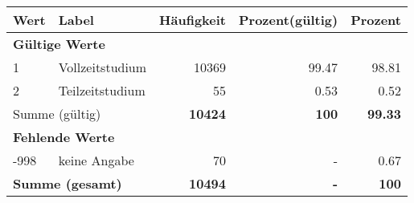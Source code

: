      \begin{longtable}{lXrrr}
     \toprule
     \textbf{Wert} & \textbf{Label} & \textbf{Häufigkeit} & \textbf{Prozent(gültig)} & \textbf{Prozent} \\
     \endhead
     \midrule
     \multicolumn{5}{l}{\textbf{Gültige Werte}}\\

     1 &
     \multicolumn{1}{X}{ Vollzeitstudium   } &


       \num{10369} &
       \num[round-mode=places,round-precision=2]{99,47} &
         \num[round-mode=places,round-precision=2]{98,81} \\

     2 &
     \multicolumn{1}{X}{ Teilzeitstudium   } &


       \num{55} &
       \num[round-mode=places,round-precision=2]{0,53} &
         \num[round-mode=places,round-precision=2]{0,52} \\
     \midrule
     \multicolumn{2}{l}{Summe (gültig)} &
       \textbf{\num{10424}} &
     \textbf{100} &
       \textbf{\num[round-mode=places,round-precision=2]{99,33}} \\
     \multicolumn{5}{l}{\textbf{Fehlende Werte}}\\
       -998 &
       keine Angabe &
         \num{70} &
        - &
         \num[round-mode=places,round-precision=2]{0,67} \\
     \midrule
     \multicolumn{2}{l}{\textbf{Summe (gesamt)}} &
          \textbf{\num{10494}} &
        \textbf{-} &
        \textbf{100} \\
     \bottomrule
     \end{longtable}
     
